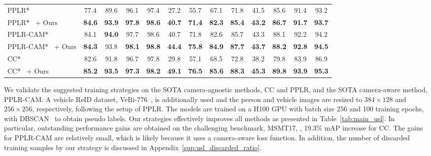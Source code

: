 \begin{table}[t]
{\begin{tabular}{l|cccc|cccc|cccc}
        PPLR*~\citep{cho2022part} & 77.4 & 89.6 & 96.1 & 97.4 & 27.2 & 55.7 & 67.1 & 71.8 & 41.5 & 85.6 & 91.4 & 93.2 \\
        PPLR*~\citep{cho2022part} + Ours & \textbf{84.6} & \textbf{93.9} & \textbf{97.8} & \textbf{98.6} & \textbf{40.7} & \textbf{71.4} & \textbf{82.3} & \textbf{85.4} & \textbf{43.2} & \textbf{86.7} & \textbf{91.7} & \textbf{93.7} \\
        \hline
        PPLR-CAM*~\citep{cho2022part} & 84.1 & \textbf{94.0} & 97.7 & 98.6 & 40.7 & 71.8 & 82.6 & 85.7 & 43.3 & 88.1 & 92.2 & 94.2 \\
        PPLR-CAM*~\citep{cho2022part} + Ours & \textbf{84.3} & 93.8 & \textbf{98.1} & \textbf{98.8} & \textbf{44.4} & \textbf{75.8} & \textbf{84.9} & \textbf{87.7} & \textbf{43.7} & \textbf{88.2} & \textbf{92.8} & \textbf{94.5} \\
        \hline
        CC*~\citep{dai2022cluster} & 82.6 & 91.8 & 96.7 & 97.8 & 29.8 & 57.1 & 68.5 & 72.8 & 38.2 & 79.8 & 83.9 & 86.9 \\
        CC*~\citep{dai2022cluster} + Ours & \textbf{85.2} & \textbf{93.5} & \textbf{97.3} & \textbf{98.2} & \textbf{49.1} & \textbf{76.5} & \textbf{85.6} & \textbf{88.3} & \textbf{45.3} & \textbf{89.8} & \textbf{93.9} & \textbf{95.3}  \\
        \hline							
    \end{tabular}
    }
\end{table}

We validate the suggested training strategies on the SOTA camera-agnostic methods, CC and PPLR, and the SOTA camera-aware method, PPLR-CAM.
A vehicle ReID dataset, VeRi-776~\citep{veri}, is additionally used and the person and vehicle images are resized to $384\times128$ and $256\times256$, respectively, following the setup of PPLR.
The models are trained on a H100 GPU with batch size 256 and 100 training epochs, with DBSCAN~\citep{dbscan} to obtain pseudo labels. Our strategies effectively improves all methods as presented in Table~\ref{tab:main_usl}.
In particular, outstanding performance gains are obtained on the challenging benchmark, MSMT17, 
\eg, 19.3\% mAP increase for CC.
The gains for PPLR-CAM are relatively small, which is likely because it uses a camera-aware loss function. 
In addition, the number of discarded training samples by our strategy is discussed in Appendix~\ref{sup:usl_discarded_ratio}.


